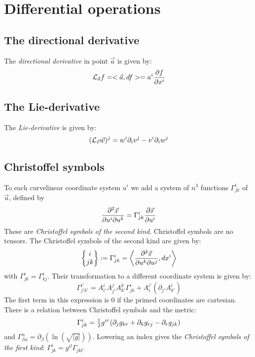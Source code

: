 \documentclass[a4paper,fancyheadings,twoside]{report}
\begin{document}
\section{Differential operations}
\subsection{The directional derivative}
The {\it directional derivative} in point $\vec{a}$ is given by:
\[
{\cal L}_{\vec{a}}f=<\vec{a},df>=a^i\frac{\partial f}{\partial x^i}
\]

\subsection{The Lie-derivative}
The {\it Lie-derivative} is given by:
\[
({\cal L}_{\vec{v}}\vec{w})^j=w^i\partial_iv^j-v^i\partial_iw^j
\]

\subsection{Christoffel symbols}
To each curvelinear coordinate system $u^i$ we add a system of $n^3$
functions $\Gamma^i_{jk}$ of $\vec{u}$, defined by
\[
\frac{\partial^2\vec{x}}{\partial u^i\partial u^k}=\Gamma_{jk}^i\frac{\partial \vec{x}}{\partial u^i}
\]
These are {\it Christoffel symbols of the second kind}. Christoffel symbols
are no tensors. The Christoffel symbols of the second kind are given by:
\[
\left\{\begin{array}{@{}c@{}}i\\ jk \end{array}\right\}:=\Gamma^i_{jk}=
\left\langle\frac{\partial^2\vec{x}}{\partial u^k\partial u^j},dx^i\right\rangle
\]
with $\Gamma^i_{jk}=\Gamma^i_{kj}$. Their transformation to a different
coordinate system is given by:
\[
\Gamma_{j'k'}^{i'}=A_{i'}^iA_{j'}^jA_{k'}^k\Gamma^i_{jk}+A_i^{i'}(\partial_{j'}A_{k'}^i)
\]
The first term in this expression is 0 if the primed coordinates are
cartesian.
\npar
There is a relation between Christoffel symbols and the metric:
\[
\Gamma_{jk}^i=\mbox{$\frac{1}{2}$} g^{ir}(\partial_j g_{kr}+\partial_k g_{rj}-\partial_r g_{jk})
\]
and $\Gamma^\alpha_{\beta\alpha}=\partial_\beta(\ln(\sqrt{|g|}))$.
\npar
Lowering an index gives the {\it Christoffel symbols of the first kind}:
$\Gamma^i_{jk}=g^{il}\Gamma_{jkl}$.
\end{document}
